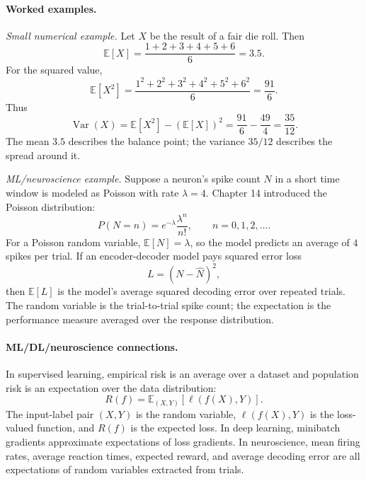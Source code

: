 \paragraph{Worked examples.}
\emph{Small numerical example.} Let \(X\) be the result of a fair die roll. Then
\[
\mathbb{E}[X]
=\frac{1+2+3+4+5+6}{6}
=3.5.
\]
For the squared value,
\[
\mathbb{E}[X^2]
=\frac{1^2+2^2+3^2+4^2+5^2+6^2}{6}
=\frac{91}{6}.
\]
Thus
\[
\operatorname{Var}(X)
=\mathbb{E}[X^2]-(\mathbb{E}[X])^2
=\frac{91}{6}-\frac{49}{4}
=\frac{35}{12}.
\]
The mean \(3.5\) describes the balance point; the variance \(35/12\) describes the spread around it.

\emph{ML/neuroscience example.} Suppose a neuron's spike count \(N\) in a short time window is modeled as Poisson with rate \(\lambda=4\). Chapter 14 introduced the Poisson distribution:
\[
P(N=n)=e^{-\lambda}\frac{\lambda^n}{n!},\qquad n=0,1,2,\ldots.
\]
For a Poisson random variable, \(\mathbb{E}[N]=\lambda\), so the model predicts an average of \(4\) spikes per trial. If an encoder-decoder model pays squared error loss
\[
L=(N-\widehat N)^2,
\]
then \(\mathbb{E}[L]\) is the model's average squared decoding error over repeated trials. The random variable is the trial-to-trial spike count; the expectation is the performance measure averaged over the response distribution.

\paragraph{ML/DL/neuroscience connections.}
In supervised learning, empirical risk is an average over a dataset and population risk is an expectation over the data distribution:
\[
R(f)=\mathbb{E}_{(X,Y)}[\ell(f(X),Y)].
\]
The input-label pair \((X,Y)\) is the random variable, \(\ell(f(X),Y)\) is the loss-valued function, and \(R(f)\) is the expected loss. In deep learning, minibatch gradients approximate expectations of loss gradients. In neuroscience, mean firing rates, average reaction times, expected reward, and average decoding error are all expectations of random variables extracted from trials.

